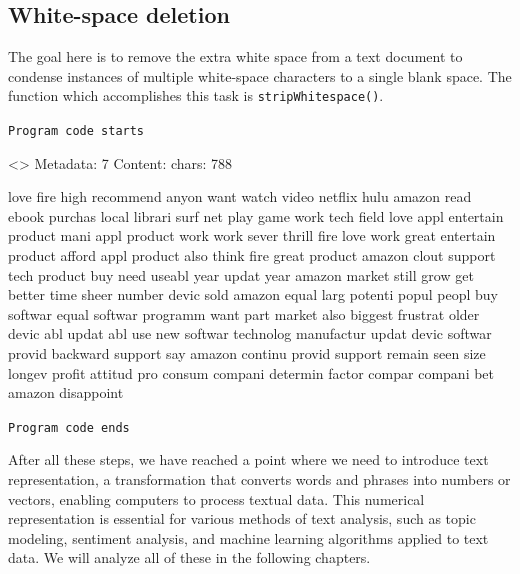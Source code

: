 \subsection{White-space deletion}\label{white-space-deletion}

The goal here is to remove the extra white space from a text document to
condense instances of multiple white-space characters to a single blank
space. The function which accomplishes this task is
\texttt{stripWhitespace()}.

\texttt{Program\ code\ starts}

\begin{Shaded}
\begin{Highlighting}[]
\OtherTok{\textless{}{-}} 

\NormalTok{(docs[[}\NormalTok{]])}
\end{Highlighting}
\end{Shaded}

\textless{}\textgreater{} Metadata: 7 Content: chars: 788

love fire high recommend anyon want watch video netflix hulu amazon read
ebook purchas local librari surf net play game work tech field love appl
entertain product mani appl product work work sever thrill fire love
work great entertain product afford appl product also think fire great
product amazon clout support tech product buy need useabl year updat
year amazon market still grow get better time sheer number devic sold
amazon equal larg potenti popul peopl buy softwar equal softwar programm
want part market also biggest frustrat older devic abl updat abl use new
softwar technolog manufactur updat devic softwar provid backward support
say amazon continu provid support remain seen size longev profit attitud
pro consum compani determin factor compar compani bet amazon disappoint

\texttt{Program\ code\ ends}

After all these steps, we have reached a point where we need to
introduce text representation, a transformation that converts
words and phrases into numbers or vectors, enabling computers to process
textual data. This numerical representation is essential for various methods of text
analysis, such as topic modeling, sentiment analysis, and
machine learning algorithms applied to text data. We will analyze all of
these in the following chapters.

